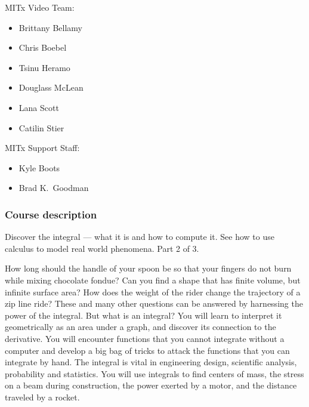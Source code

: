 \documentclass[pdftex, brazil, 12pt, twoside]{article}
\begin{document}
MITx Video Team:
\begin{itemize}[noitemsep]
\item Brittany Bellamy
\item Chris Boebel
\item Tsinu Heramo
\item Douglass McLean
\item Lana Scott
\item Catilin Stier
\end{itemize}

\newpage
MITx Support Staff:
\begin{itemize}[noitemsep]
\item Kyle Boots
\item Brad K.\ Goodman
\end{itemize}


\subsubsection{Course description}
\label{gs-ol-description}

Discover the integral --- what it is and how to compute it. See how to use calculus
to model real world phenomena. Part 2 of 3.

How long should the handle of your spoon be so that your fingers do not burn while
mixing chocolate fondue? Can you find a shape that has finite volume, but infinite
surface area? How does the weight of the rider change the trajectory of a zip line
ride? These and many other questions can be answered by harnessing the power of the
integral. But what is an integral? You will learn to interpret it geometrically as
an area under a graph, and discover its connection to the derivative. You will encounter
functions that you cannot integrate without a computer and develop a big bag of tricks
to attack the functions that you can integrate by hand. The integral is vital in engineering
design, scientific analysis, probability and statistics. You will use integrals to find
centers of mass, the stress on a beam during construction, the power exerted by a motor,
and the distance traveled by a rocket.
\end{document}
